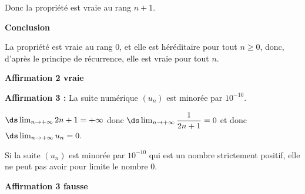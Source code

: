 \begin{list}{\textbullet}{}
\begin{list}{\textbullet}{}
Donc la propriété est vraie au rang $n+1$.

\item \textbf{Conclusion}

La propriété est vraie au rang $0$, et elle est héréditaire pour tout $n\geqslant 0$, donc, d'après le principe de récurrence, elle est vraie pour tout $n$.
\end{list}

\hfill\textbf{Affirmation 2 vraie}

\item \textbf{Affirmation 3 :} \og{}La suite numérique $\left(u_{n}\right)$ est minorée par $10^{-10}$.\fg{}

$\ds\lim_{n\to +\infty} 2n+1=+\infty$ donc $\ds\lim_{n\to +\infty} \dfrac{1}{2n+1}=0$ et donc $\ds\lim_{n\to +\infty} u_n=0$.

Si la suite $(u_n)$ est minorée par $10^{-10}$ qui est un nombre strictement positif, elle ne peut pas avoir pour limite le nombre 0.

\hfill\textbf{Affirmation 3 fausse}

\end{list}

